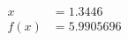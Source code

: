 \documentclass[preview]{standalone}
\begin{document}
\begin{align*}
x &= 1.3446\\f(x) &= 5.9905696
\end{align*}
\end{document}
